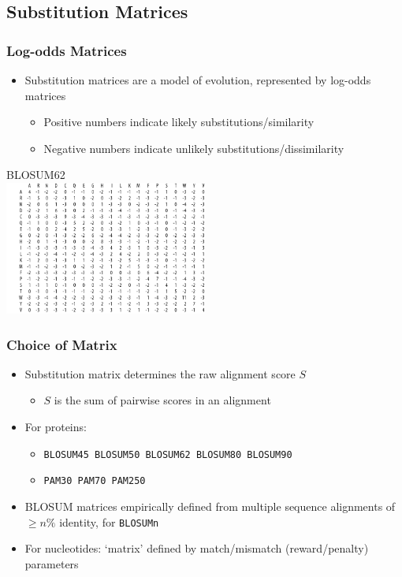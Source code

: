%

\subsection{Substitution Matrices}
\begin{frame}
  \frametitle{Log-odds Matrices}
  \begin{itemize}
    \item Substitution matrices are a model of evolution, represented by log-odds matrices
    \begin{itemize}
      \item Positive numbers indicate likely substitutions/similarity
      \item Negative numbers indicate unlikely substitutions/dissimilarity
    \end{itemize}
  \end{itemize}
  \begin{center}
   BLOSUM62 \\
   \includegraphics[width=0.5\textwidth]{images/blosum62} 
 \end{center}         
\end{frame} 

\begin{frame}
  \frametitle{Choice of Matrix}
  \begin{itemize}
    \item Substitution matrix determines the raw alignment score $S$
    \begin{itemize}
      \item $S$ is the sum of pairwise scores in an alignment
    \end{itemize}
    \item For proteins:
    \begin{itemize}
      \item \texttt{BLOSUM45 BLOSUM50 BLOSUM62 BLOSUM80 BLOSUM90}
      \item \texttt{PAM30 PAM70 PAM250}
    \end{itemize}
    \item BLOSUM matrices empirically defined from multiple sequence alignments of $\geq n\%$ identity, for \texttt{BLOSUMn}
    \item For nucleotides: `matrix' defined by match/mismatch (reward/penalty) parameters
  \end{itemize}
\end{frame} 
